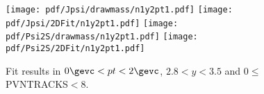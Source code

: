 \begin{figure}[H]
\begin{center}
\texttt{[image: pdf/Jpsi/drawmass/n1y2pt1.pdf]}
\texttt{[image: pdf/Jpsi/2DFit/n1y2pt1.pdf]}
\vspace*{-0.5cm}
\texttt{[image: pdf/Psi2S/drawmass/n1y2pt1.pdf]}
\texttt{[image: pdf/Psi2S/2DFit/n1y2pt1.pdf]}
\vspace*{-0.5cm}
\end{center}
\caption{Fit results in $0\gevc<pt<2\gevc$, $2.8<y<3.5$ and 0$\leq$PVNTRACKS$<$8.}
\label{Fitn1y2pt1}
\end{figure}

